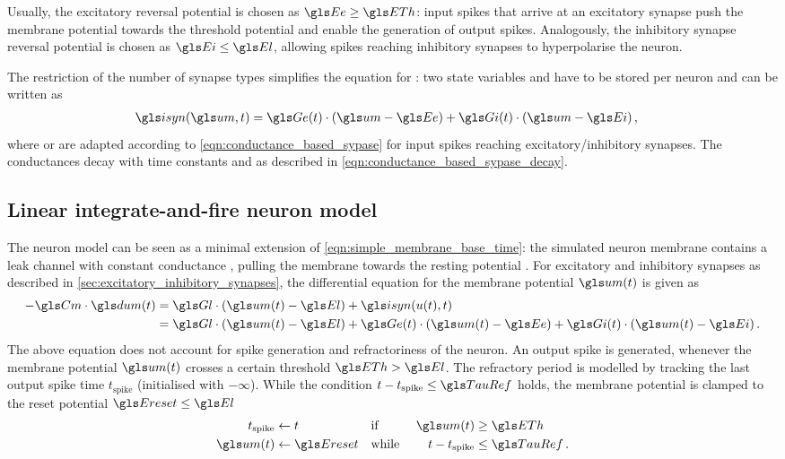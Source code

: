 Usually, the excitatory reversal potential is chosen as $\Ee \geq \ETh$: input spikes that arrive at an excitatory synapse push the membrane potential \um towards the threshold potential \ETh and enable the generation of output spikes. Analogously, the inhibitory synapse reversal potential is chosen as $\Ei \leq \El$, allowing spikes reaching inhibitory synapses to hyperpolarise the neuron.

The restriction of the number of synapse types simplifies the equation for \isyn: two state variables \Ge and \Gi have to be stored per neuron and \isyn can be written as
\begin{align}
	\isyn(\um, t) &= \Ge(t) \cdot (\um - \Ee) + \Gi(t) \cdot (\um - \Ei) \,,
\end{align}
where \Ge or \Gi are adapted according to \cref{eqn:conductance_based_sypase} for input spikes reaching excitatory/inhibitory synapses. The conductances decay with time constants \TauE and \TauI as described in \cref{eqn:conductance_based_sypase_decay}.

\subsection{Linear integrate-and-fire neuron model}
\label{sec:lif}

The \LIF neuron model can be seen as a minimal extension of \cref{eqn:simple_membrane_base_time}: the simulated neuron membrane contains a leak channel with constant conductance \Gl, pulling the membrane towards the resting potential \El. For excitatory and inhibitory synapses as described in \cref{sec:excitatory_inhibitory_synapses}, the differential equation for the membrane potential $\um(t)$ is given as
\begin{align}
	- \Cm \cdot \dum(t) &= \Gl \cdot (\um(t) - \El) + \isyn(u(t), t) \label{eqn:lif} \\
		&= \Gl \cdot (\um(t) - \El) + \Ge(t) \cdot (\um(t) - \Ee) + \Gi(t) \cdot (\um(t) - \Ei) \notag \,.
\end{align}
The above equation does not account for spike generation and refractoriness of the neuron. An output spike is generated, whenever the membrane potential $\um(t)$ crosses a certain threshold $\ETh > \El$. The refractory period is modelled by tracking the last output spike time $t_{\mathrm{spike}}$ (initialised with $-\infty$). While the condition $t - t_\mathrm{spike} \leq \TauRef$ holds, the membrane potential is clamped to the reset potential $\Ereset \leq \El$
\begin{align}
	t_\mathrm{spike} &\gets t &&\text{if } & \um(t) &\geq \ETh \\
	\um(t) &\gets \Ereset &&\text{while } & t - t_\mathrm{spike} &\leq \TauRef \,.
	\label{eqn:lif_reset}
\end{align}

